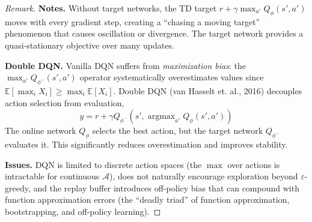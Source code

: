 \documentclass[11pt, letterpaper]{article}
\DeclareMathOperator*{\argmax}{argmax}
\let\geq\geqslant
\newenvironment{remark}
    {\renewcommand\qedsymbol{\(\blacksquare\)}\begin{proof}[Remark]}
    {\end{proof}}
\begin{document}
\begin{remark}
    \textbf{Notes.} Without target networks, the TD target \(r + \gamma \max_{a'} Q_\phi(s', a')\) moves with every gradient step, creating a ``chasing a moving target'' phenomenon that causes oscillation or divergence. The target network provides a quasi-stationary objective over many updates.

    \textbf{Double DQN.} Vanilla DQN suffers from \textit{maximization bias}: the \(\max_{a'} Q_{\phi^-}(s', a')\) operator systematically overestimates values since \(\mathbb{E}[\max_i X_i] \geq \max_i \mathbb{E}[X_i]\). Double DQN (van Hasselt et. al., 2016) decouples action selection from evaluation,
    \[
        y = r + \gamma Q_{\phi^-}(s', \argmax_{a'} Q_\phi(s', a'))
    \]
    The online network \(Q_\phi\) selects the best action, but the target network \(Q_{\phi^-}\) evaluates it. This significantly reduces overestimation and improves stability.

    \textbf{Issues.} DQN is limited to discrete action spaces (the \(\max\) over actions is intractable for continuous \(\mathcal{A}\)), does not naturally encourage exploration beyond \(\varepsilon\)-greedy, and the replay buffer introduces off-policy bias that can compound with function approximation errors (the ``deadly triad'' of function approximation, bootstrapping, and off-policy learning).
\end{remark}
\end{document}
